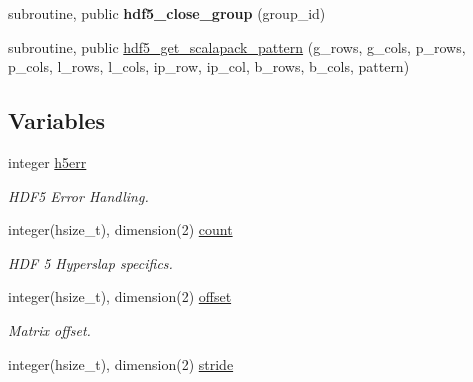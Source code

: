 \begin{DoxyCompactItemize}
\item 
\hypertarget{namespacehdf5__tools_a18ebd57f31e80cb9a7e57a5c432b8d92}{}subroutine, public {\bfseries hdf5\+\_\+close\+\_\+group} (group\+\_\+id)\label{namespacehdf5__tools_a18ebd57f31e80cb9a7e57a5c432b8d92}

\item 
subroutine, public \hyperlink{namespacehdf5__tools_a3d610b11f1a3ae2bfa4ac30391fa9d4e}{hdf5\+\_\+get\+\_\+scalapack\+\_\+pattern} (g\+\_\+rows, g\+\_\+cols, p\+\_\+rows, p\+\_\+cols, l\+\_\+rows, l\+\_\+cols, ip\+\_\+row, ip\+\_\+col, b\+\_\+rows, b\+\_\+cols, pattern)
\end{DoxyCompactItemize}
\subsection*{Variables}
\begin{DoxyCompactItemize}
\item 
\hypertarget{namespacehdf5__tools_af5d3c7f11daf2da6ee7560d244fd8d30}{}integer \hyperlink{namespacehdf5__tools_af5d3c7f11daf2da6ee7560d244fd8d30}{h5err}\label{namespacehdf5__tools_af5d3c7f11daf2da6ee7560d244fd8d30}

\begin{DoxyCompactList}\small\item\em H\+D\+F5 Error Handling. \end{DoxyCompactList}\item 
integer(hsize\+\_\+t), dimension(2) \hyperlink{namespacehdf5__tools_ab0fa929a10c9118648f7c316033e2fd9}{count}
\begin{DoxyCompactList}\small\item\em H\+D\+F 5 Hyperslap specifics. \end{DoxyCompactList}\item 
\hypertarget{namespacehdf5__tools_ade157e8bd266c4206b2ca7f57e37de8c}{}integer(hsize\+\_\+t), dimension(2) \hyperlink{namespacehdf5__tools_ade157e8bd266c4206b2ca7f57e37de8c}{offset}\label{namespacehdf5__tools_ade157e8bd266c4206b2ca7f57e37de8c}

\begin{DoxyCompactList}\small\item\em Matrix offset. \end{DoxyCompactList}\item 
\hypertarget{namespacehdf5__tools_ac27d32db7d4f517455a874f695763a58}{}integer(hsize\+\_\+t), dimension(2) \hyperlink{namespacehdf5__tools_ac27d32db7d4f517455a874f695763a58}{stride}\label{namespacehdf5__tools_ac27d32db7d4f517455a874f695763a58}


\end{DoxyCompactItemize}
